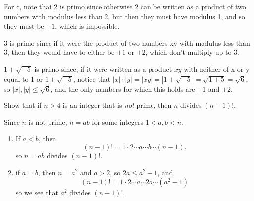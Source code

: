 \documentclass[11pt,dvipsnames]{book}
\numberwithin{equation}{section} %
\numberwithin{figure}{section} %
\numberwithin{table}{section} %
\begin{document}
\begin{exercise}
\begin{solution}
For c, note that 2 is primo since otherwise 2 can be written as a product of two numbers with modulus less than 2, but then they must have modulus 1, and so they must be $\pm1$, which is impossible.


3 is primo since if it were the product of two numbers xy with modulus less than 3, then they would have to either be $\pm 1$ or $\pm 2$, which don't multiply up to 3.


$1+\sqrt{-5}$ is primo since, if it were written as a product $xy$ with neither of x or y equal to 1 or $1+\sqrt{-5}$, notice that $|x|\cdot |y|=|xy|=|1+\sqrt{-5}|=\sqrt{1+5}=\sqrt{6}$, so $|x|,|y|\leq \sqrt{6}$, and the only numbers for which this holds are $\pm 1$ and $\pm 2$.
\end{solution}


\end{exercise}



%
%
%

%
\begin{exercise} Show that if $n> 4$ is an integer that is {\it not} prime, then $n$ divides $(n-1)!$.

\begin{solution}

Since $n$ is not prime, $n=ab$ for some integers $1<a,b<n$. 
\begin{enumerate}[label=(\alph*]
\item If $a<b$, then
\[
(n-1)!=1\cdot 2 \cdots a\cdots b\cdots (n-1).
\]
so $n=ab$ divides $(n-1)!$.
\item if $a=b$, then $n=a^2$ and $a>2$, so $2a\leq a^2-1$, and 
\[
(n-1)!=1\cdot 2 \cdots a\cdots 2a\cdots (a^2-1)
\]
so we see that $a^2$ divides $(n-1)!$. 
\end{enumerate}
\end{solution}
%
\end{exercise}
\end{document}
